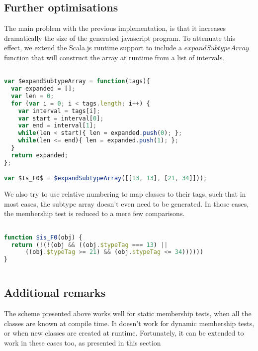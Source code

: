 \subsection{Further optimisations}
The main problem with the previous implementation, is that it increases
dramatically the size of the generated javascript program. To attenuate this
effect, we extend the Scala.js runtime support to include a
$expandSubtypeArray$ function that will construct the array at runtime from a
list of intervals.\\

\begin{lstlisting}[language=javascript,caption=Compressed subtype array,
label={lst:expandSubtypeArray}]

var $expandSubtypeArray = function(tags){
  var expanded = [];
  var len = 0;
  for (var i = 0; i < tags.length; i++) {
    var interval = tags[i];
    var start = interval[0];
    var end = interval[1];
    while(len < start){ len = expanded.push(0); };
    while(len <= end){ len = expanded.push(1); };
  }
  return expanded;
};

var $Is_F0$ = $expandSubtypeArray([[13, 13], [21, 34]]));
\end{lstlisting}

We also try to use relative numbering \cite{relativeNumbering} to map classes
to their tags, such that in most cases, the subtype array doesn't even need to
be generated. In those cases, the membership test is reduced to a mere few
comparisons.

\begin{lstlisting}[language=javascript,
caption=Constant folding of subtype array, 
label={lst:noSubtypeArray}]

function $is_F0(obj) {
  return (!(!(obj && ((obj.$typeTag === 13) || 
      ((obj.$typeTag >= 21) && (obj.$typeTag <= 34))))))
}
  
\end{lstlisting}

\subsection{Additional remarks}
The scheme presented above works well for static membership tests, when all the
classes are known at compile time. It doesn't work for dynamic membership
tests, or when new classes are created at runtime. Fortunately, it can be
extended to work in these cases too, as presented in this section

